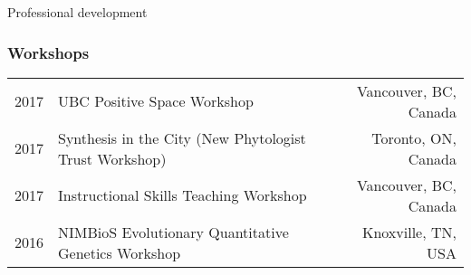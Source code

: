 \documentclass[11pt]{article}
\begin{document}
\noindent \begin{rSection}{Professional development} %

\subsubsection*{Workshops}
\begin{tabular}{llr}

2017 & UBC Positive Space Workshop & Vancouver, BC, Canada\\
2017 & Synthesis in the City (New Phytologist Trust Workshop) & Toronto, ON, Canada\\
2017 & Instructional Skills Teaching Workshop & Vancouver, BC, Canada\\
2016 & NIMBioS Evolutionary Quantitative Genetics Workshop & Knoxville, TN, USA

\end{tabular}

\end{rSection}
\vspace{0.5em}
\end{document}
